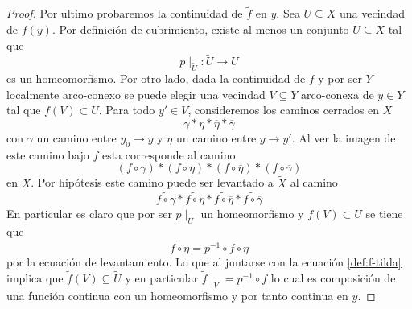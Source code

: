 \begin{proof}
  Por ultimo probaremos la continuidad de \(\tilde f\) en \(y\). Sea \(U
  \subseteq X\) una vecindad de \(f (y)\). Por definición de cubrimiento,
  existe al menos un conjunto \(\tilde U \subseteq \tilde X\) tal que
  \[p \mid_{\tilde U} : \tilde U \to U\]
  es un homeomorfismo. Por otro lado, dada la continuidad de \(f\) y
  por ser \(Y\) localmente arco-conexo se puede elegir una vecindad \(V
  \subseteq Y\) arco-conexa de \(y \in Y\) tal que \(f (V) \subset U\).
  Para todo \(y' \in V\), consideremos los caminos cerrados en \(X\)
  \[ \gamma * \eta * \overline{\eta} * \overline{\gamma} \]
  con \(\gamma\) un camino entre \(y_0 \to y\) y \(\eta\) un camino
  entre \(y \to y'\). Al ver la imagen de este camino bajo \(f\) esta
  corresponde al camino
  \[ (f \circ \gamma) * (f \circ \eta) * (f \circ \overline{\eta}) * (f
    \circ \overline{\gamma}) \]
  en \(X\). Por hipótesis este camino puede ser levantado a
  \(\tilde X\) al camino
  \[ \widetilde{f \circ \gamma} * \widetilde{f \circ \eta} *
    \widetilde{f \circ \overline{\eta}} * \widetilde{f \circ
    \overline{\gamma}} \]
  En particular es claro que por ser \(p \mid_U\) un homeomorfismo y \(f
  (V) \subset U\) se tiene que
  \[ \widetilde{f \circ \eta} = p^{-1} \circ f \circ \eta \]
  por la ecuación de levantamiento. Lo que al juntarse con la ecuación
  \eqref{def:f-tilda} implica que \(\tilde f (V) \subseteq \tilde U\) y en
  particular \( \tilde f \mid _{V} = p^{-1} \circ f \) lo cual es
  composición de una función continua con un homeomorfismo y por tanto
  continua en \(y\).
\end{proof}

